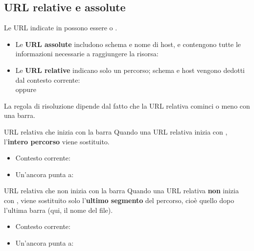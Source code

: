 \subsection{URL relative e assolute}

Le URL indicate in  possono essere  o .

\begin{itemize}
  \item Le \textbf{URL assolute} includono schema e nome di host, e contengono
        tutte le informazioni necessarie a raggiungere la risorsa: \\
  \item Le \textbf{URL relative} indicano solo un percorso; schema e host vengono
        dedotti dal contesto corrente: \\
         \quad oppure \quad
\end{itemize}

La regola di risoluzione dipende dal fatto che la URL relativa cominci o meno
con una barra.

\begin{esempio}{URL relativa che inizia con la barra}
Quando una URL relativa inizia con \code{/}, l'\textbf{intero percorso} viene
sostituito.

\begin{itemize}
  \item Contesto corrente:
  \item Un'ancora  punta a:
\end{itemize}
\end{esempio}

\begin{esempio}{URL relativa che non inizia con la barra}
Quando una URL relativa \textbf{non} inizia con \code{/}, viene sostituito solo
l'\textbf{ultimo segmento} del percorso, cioè quello dopo l'ultima barra (qui,
il nome del file).

\begin{itemize}
  \item Contesto corrente:
  \item Un'ancora  punta a:
\end{itemize}
\end{esempio}

